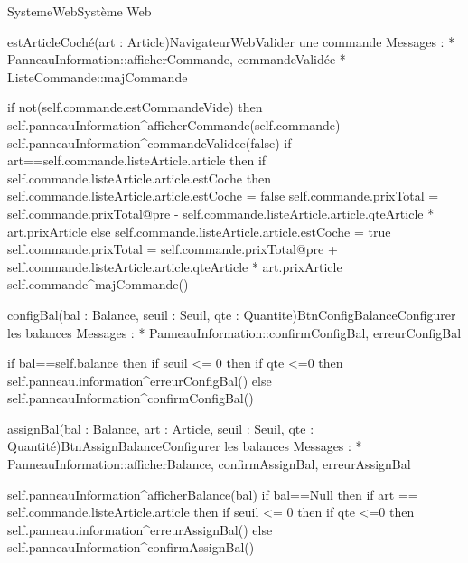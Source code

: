 \begin{OM}{SystemeWeb}{Système Web}
\begin{OMOperation}{estArticleCoché(art : Article)}{NavigateurWeb}{Valider une commande}
Messages :
* PanneauInformation::{afficherCommande, commandeValidée}
* ListeCommande::{majCommande}
\begin{OMPre}
\end{OMPre}
\begin{OMPost}
if not(self.commande.estCommandeVide) then
                self.panneauInformation^afficherCommande(self.commande)
                self.panneauInformation^commandeValidee(false)
                if art==self.commande.listeArticle.article then
                        if self.commande.listeArticle.article.estCoche then
                                self.commande.listeArticle.article.estCoche = false
                                self.commande.prixTotal = self.commande.prixTotal@pre -
self.commande.listeArticle.article.qteArticle * art.prixArticle
                        else
                                self.commande.listeArticle.article.estCoche = true
                                self.commande.prixTotal = self.commande.prixTotal@pre +
self.commande.listeArticle.article.qteArticle * art.prixArticle
                        self.commande^majCommande()
                    \end{OMPost}
\end{OMOperation}

\begin{OMOperation}{configBal(bal : Balance, seuil : Seuil, qte : Quantite)}{BtnConfigBalance}{Configurer les balances}
Messages :
* PanneauInformation::{confirmConfigBal, erreurConfigBal}
\begin{OMPre}
\end{OMPre}
\begin{OMPost}
        if bal==self.balance then
                if seuil <= 0 then
                        if qte <=0 then
                                self.panneau.information^erreurConfigBal()
        else
                self.panneauInformation^confirmConfigBal()
            \end{OMPost}
\end{OMOperation}

\begin{OMOperation}{assignBal(bal : Balance, art : Article, seuil : Seuil, qte : Quantité)}{BtnAssignBalance}{Configurer les balances}
Messages :
* PanneauInformation::{afficherBalance, confirmAssignBal, erreurAssignBal}
\begin{OMPre}
\end{OMPre}
\begin{OMPost}
        self.panneauInformation^afficherBalance(bal)
        if bal==Null then
                if art == self.commande.listeArticle.article then
                        if seuil <= 0 then
                                if qte <=0 then
                                        self.panneau.information^erreurAssignBal()
        else
                self.panneauInformation^confirmAssignBal()
            \end{OMPost}
\end{OMOperation}
\end{OM}

